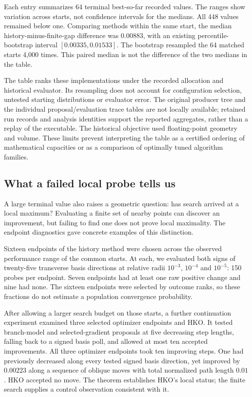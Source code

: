 Each entry summarizes 64 terminal best-so-far recorded values. The ranges
show variation across starts, not confidence intervals for the medians.
All 448 values remained below one. Comparing methods within the same start,
the median history-minus-finite-gap difference was $0.00883$, with an existing
percentile-bootstrap interval $[0.00335,0.01533]$. The bootstrap resampled the
64 matched starts 4,000 times. This paired median is not the difference of
the two medians in the table.

The table ranks these implementations under the recorded allocation and
historical evaluator. Its resampling does not account for configuration
selection, untested starting distributions or evaluator error. The original
producer tree and the individual proposal/evaluation trace tables are not
locally available; retained run records and analysis identities support the
reported aggregates, rather than a replay of the executable. The historical
objective used floating-point geometry and volume. These limits prevent
interpreting the table as a certified ordering of mathematical capacities
or as a comparison of optimally tuned algorithm families.

\subsection{What a failed local probe tells us}

A large terminal value also raises a geometric question: has search arrived
at a local maximum? Evaluating a finite set of nearby points can discover an
improvement, but failing to find one does not prove local maximality.
The endpoint diagnostics gave concrete examples of this distinction.

Sixteen endpoints of the history method were chosen across the observed
performance range of the common starts. At each, we evaluated both signs of
twenty-five transverse basis directions at relative radii $10^{-3}$,
$10^{-4}$ and $10^{-5}$: 150 probes per endpoint. Seven endpoints had at least
one raw positive change and nine had none. The sixteen endpoints were
selected by outcome ranks, so these fractions do not estimate a population
convergence probability.

After allowing a larger search budget on those starts, a further continuation
experiment examined three selected optimizer endpoints and HKO. It tested
branch-model and selected-gradient proposals at five decreasing step lengths,
falling back to a signed basis poll, and allowed at most ten accepted
improvements. All three optimizer endpoints took ten improving steps. One
had previously decreased along every tested signed basis direction, yet
improved by $0.00223$ along a sequence of oblique moves with total normalized
path length $0.01$. HKO accepted no move. The theorem establishes HKO's local
status; the finite search supplies a control observation consistent with it.

